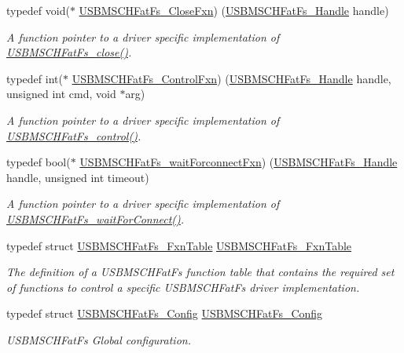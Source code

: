 \begin{DoxyCompactItemize}
typedef void($\ast$ \hyperlink{_u_s_b_m_s_c_h_fat_fs_8h_a599ab79cca3d2ca8f00c72574baf6694}{U\+S\+B\+M\+S\+C\+H\+Fat\+Fs\+\_\+\+Close\+Fxn}) (\hyperlink{_u_s_b_m_s_c_h_fat_fs_8h_ae35f957205bbddee73fb052b33b1719b}{U\+S\+B\+M\+S\+C\+H\+Fat\+Fs\+\_\+\+Handle} handle)
\begin{DoxyCompactList}\small\item\em A function pointer to a driver specific implementation of \hyperlink{_u_s_b_m_s_c_h_fat_fs_8h_a842d3efc8c9eec33b501c3215a9c4abf}{U\+S\+B\+M\+S\+C\+H\+Fat\+Fs\+\_\+close()}. \end{DoxyCompactList}\item 
typedef int($\ast$ \hyperlink{_u_s_b_m_s_c_h_fat_fs_8h_aee939ae4a7a17ef93e777a855bc70dcc}{U\+S\+B\+M\+S\+C\+H\+Fat\+Fs\+\_\+\+Control\+Fxn}) (\hyperlink{_u_s_b_m_s_c_h_fat_fs_8h_ae35f957205bbddee73fb052b33b1719b}{U\+S\+B\+M\+S\+C\+H\+Fat\+Fs\+\_\+\+Handle} handle, unsigned int cmd, void $\ast$arg)
\begin{DoxyCompactList}\small\item\em A function pointer to a driver specific implementation of \hyperlink{_u_s_b_m_s_c_h_fat_fs_8h_a8725aac569cefabe624b5bfda0d07422}{U\+S\+B\+M\+S\+C\+H\+Fat\+Fs\+\_\+control()}. \end{DoxyCompactList}\item 
typedef bool($\ast$ \hyperlink{_u_s_b_m_s_c_h_fat_fs_8h_a0c9baca220e5c94c5b5e27cb8963e6f8}{U\+S\+B\+M\+S\+C\+H\+Fat\+Fs\+\_\+wait\+Forconnect\+Fxn}) (\hyperlink{_u_s_b_m_s_c_h_fat_fs_8h_ae35f957205bbddee73fb052b33b1719b}{U\+S\+B\+M\+S\+C\+H\+Fat\+Fs\+\_\+\+Handle} handle, unsigned int timeout)
\begin{DoxyCompactList}\small\item\em A function pointer to a driver specific implementation of \hyperlink{_u_s_b_m_s_c_h_fat_fs_8h_afc7ee4e1bbb95a37943335833a27f94c}{U\+S\+B\+M\+S\+C\+H\+Fat\+Fs\+\_\+wait\+For\+Connect()}. \end{DoxyCompactList}\item 
typedef struct \hyperlink{struct_u_s_b_m_s_c_h_fat_fs___fxn_table}{U\+S\+B\+M\+S\+C\+H\+Fat\+Fs\+\_\+\+Fxn\+Table} \hyperlink{_u_s_b_m_s_c_h_fat_fs_8h_a1d6f17f051fce0337c51c8c56d9b4675}{U\+S\+B\+M\+S\+C\+H\+Fat\+Fs\+\_\+\+Fxn\+Table}
\begin{DoxyCompactList}\small\item\em The definition of a U\+S\+B\+M\+S\+C\+H\+Fat\+Fs function table that contains the required set of functions to control a specific U\+S\+B\+M\+S\+C\+H\+Fat\+Fs driver implementation. \end{DoxyCompactList}\item 
typedef struct \hyperlink{struct_u_s_b_m_s_c_h_fat_fs___config}{U\+S\+B\+M\+S\+C\+H\+Fat\+Fs\+\_\+\+Config} \hyperlink{_u_s_b_m_s_c_h_fat_fs_8h_a880b0f12857d333b89a769963e0aad40}{U\+S\+B\+M\+S\+C\+H\+Fat\+Fs\+\_\+\+Config}
\begin{DoxyCompactList}\small\item\em U\+S\+B\+M\+S\+C\+H\+Fat\+Fs Global configuration. \end{DoxyCompactList}\end{DoxyCompactItemize}
